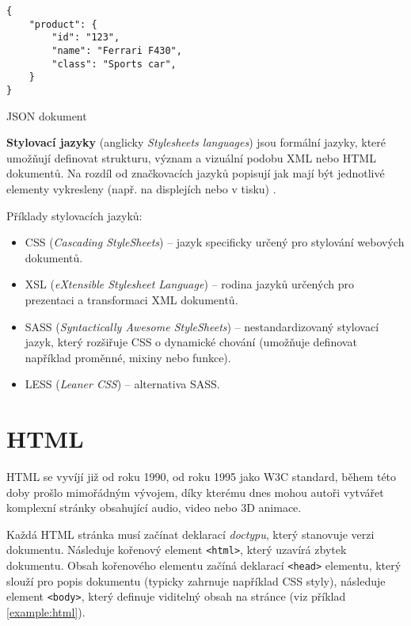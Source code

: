 \begin{example}
    \centering
    \begin{lstlisting}
{
    "product": {
        "id": "123",
        "name": "Ferrari F430",
        "class": "Sports car",
    }
}
    \end{lstlisting}
    \caption{JSON dokument}
    \label{example:json}
\end{example}

\textbf{Stylovací jazyky} (anglicky \textit{Stylesheets languages}) jsou formální jazyky, které umožňují definovat strukturu, význam a vizuální podobu XML nebo HTML dokumentů. Na rozdíl od značkovacích jazyků popisují jak mají být jednotlivé elementy vykresleny (např. na displejích nebo v tisku) \cite{16}.

Příklady stylovacích jazyků:

\begin{itemize}
    \item CSS (\textit{Cascading StyleSheets}) -- jazyk specificky určený pro stylování webových dokumentů.
    \item XSL (\textit{eXtensible Stylesheet Language}) -- rodina jazyků určených pro prezentaci a transformaci XML dokumentů.
    \item SASS (\textit{Syntactically Awesome StyleSheets}) -- nestandardizovaný stylovací jazyk, který rozšiřuje CSS o dynamické chování (umožňuje definovat například proměnné, mixiny nebo funkce).
    \item LESS (\textit{Leaner CSS}) -- alternativa SASS.
\end{itemize}

\section{HTML}
\label{sec:html}

HTML se vyvíjí již od roku 1990, od roku 1995 jako W3C standard, během této doby prošlo mimořádným vývojem, díky kterému dnes mohou autoři vytvářet komplexní stránky obsahující audio, video nebo 3D animace.

Každá HTML stránka musí začínat deklarací \textit{doctypu}, který stanovuje verzi dokumentu. Následuje kořenový element \texttt{<html>}, který uzavírá zbytek dokumentu. Obsah kořenového elementu začíná deklarací \texttt{<head>} elementu, který slouží pro popis dokumentu (typicky zahrnuje například CSS styly), následuje element \texttt{<body>}, který definuje viditelný obsah na stránce (viz příklad \ref{example:html}).

